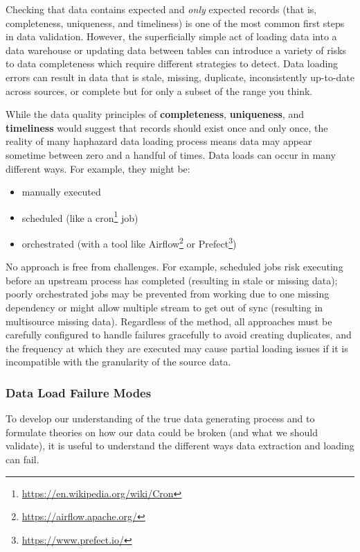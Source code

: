 \documentclass[
]{krantz}
\providecommand{\tightlist}{%
  \setlength{\itemsep}{0pt}\setlength{\parskip}{0pt}}
\renewcommand{\href}[2]{#2\footnote{\url{#1}}}
\begin{document}
Checking that data contains expected and \emph{only} expected records (that is, completeness, uniqueness, and timeliness) is one of the most common first steps in data validation.
However, the superficially simple act of loading data into a data warehouse or updating data between tables can introduce a variety of risks to data completeness which require different strategies to detect.
Data loading errors can result in data that is stale, missing, duplicate, inconsistently up-to-date across sources, or complete but for only a subset of the range you think.

While the data quality principles of \textbf{completeness}, \textbf{uniqueness}, and \textbf{timeliness} would suggest that records should exist once and only once, the reality of many haphazard data loading process means data may appear sometime between zero and a handful of times. Data loads can occur in many different ways.
For example, they might be:

\begin{itemize}
\tightlist
\item
  manually executed
\item
  scheduled (like a \href{https://en.wikipedia.org/wiki/Cron}{cron} job)
\item
  orchestrated (with a tool like \href{https://airflow.apache.org/}{Airflow} or \href{https://www.prefect.io/}{Prefect})
\end{itemize}

No approach is free from challenges.
For example, scheduled jobs risk executing before an upstream process has completed (resulting in stale or missing data);
poorly orchestrated jobs may be prevented from working due to one missing dependency or might allow multiple stream to get out of sync (resulting in multisource missing data).
Regardless of the method, all approaches must be carefully configured to handle failures gracefully to avoid creating duplicates, and the frequency at which they are executed may cause partial loading issues if it is incompatible with the granularity of the source data.

\hypertarget{data-load-failure-modes}{%
\subsubsection{Data Load Failure Modes}\label{data-load-failure-modes}}

To develop our understanding of the true data generating process and to formulate theories on how our data could be broken (and what we should validate), it is useful to understand the different ways data extraction and loading can fail.
\end{document}
